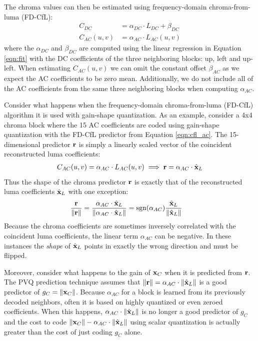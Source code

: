 \documentclass[conference, 10pt]{IEEEtran}
\def\sgn{\mathop{\rm sgn}}
\begin{document}
The chroma values can then be estimated using frequency-domain chroma-from-luma
 (FD-CfL):
\begin{align}
C_{DC} &= \alpha_{DC}\cdot L_{DC} + \beta_{DC} \\
C_{AC}(u,v) &= \alpha_{AC}\cdot L_{AC}(u,v)\label{eqn:cfl_ac}
\end{align}
where the $\alpha_{DC}$ and $\beta_{DC}$ are computed using the linear
 regression in Equation \ref{eqn:fit} with the DC coefficients of the three
 neighboring blocks: up, left and up-left.
When estimating $C_{AC}(u,v)$ we can omit the constant offset $\beta_{AC}$
 as we expect the AC coefficients to be zero mean.
Additionally, we do not include all of the AC coefficients from the same three
 neighboring blocks when computing $\alpha_{AC}$.

Consider what happens when the frequency-domain chroma-from-luma (FD-CfL)
 algorithm it is used with gain-shape quantization.
As an example, consider a 4x4 chroma block where the 15 AC coefficients are
 coded using gain-shape quantization with the FD-CfL predictor from
 Equation \ref{eqn:cfl_ac}.
The 15-dimensional predictor ${\bf r}$ is simply a linearly scaled vector of
 the coincident reconstructed luma coefficients:
\begin{align}
C_{AC}(u,v) = \alpha_{AC}\cdot L_{AC}(u,v)\implies {\bf r} = \alpha_{AC}\cdot\hat{{\bf x}}_L
\end{align}
Thus the shape of the chroma predictor ${\bf r}$ is exactly that of the
 reconstructed luma coefficients $\hat{{\bf x}}_L$ with one exception:
\begin{align}
\frac{{\bf r}}{\left\|{\bf r}\right\|} & =
 \frac{\alpha_{AC}\cdot\hat{{\bf x}}_L}{\left\|\alpha_{AC}\cdot\hat{{\bf x}}_L\right\|} =
 \sgn(\alpha_{AC})\frac{\hat{{\bf x}}_L}{\left\|\hat{{\bf x}}_L\right\|}
\end{align}
Because the chroma coefficients are sometimes inversely correlated with the
 coincident luma coefficients, the linear term $\alpha_{AC}$ can be negative.
In these instances the {\em shape} of $\hat{{\bf x}}_L$ points in exactly the
 wrong direction and must be flipped.

Moreover, consider what happens to the gain of ${\bf x}_C$ when it is predicted
 from ${\bf r}$.
The PVQ prediction technique assumes that
$\left\|{\bf r}\right\| = \alpha_{AC}\cdot\left\|\hat{{\bf x}}_L\right\|$ is a
 good predictor of $g_C = \left\|{\bf x}_C\right\|$.
Because $\alpha_{AC}$ for a block is learned from its previously decoded
 neighbors, often it is based on highly quantized or even zeroed coefficients.
When this happens, $\alpha_{AC}\cdot\left\|\hat{{\bf x}}_L\right\|$ is no
 longer a good predictor of $g_C$ and the cost to code
 $\left\|{\bf x}_C\right\|-\alpha_{AC}\cdot\left\|\hat{{\bf x}}_L\right\|$
 using scalar quantization is actually greater than the cost of just coding
 $g_C$ alone.
\end{document}
